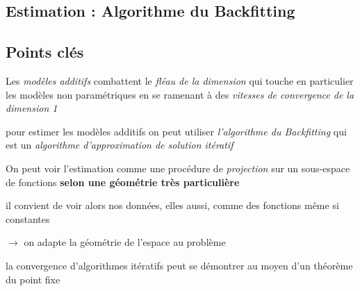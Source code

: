{
    {
        
    }
    \subsection{Estimation : Algorithme du Backfitting}
    {
        
    }
    \subsection{Points clés}\label{sec:backfitting_key_points}

    \begin{todolist}
        \item Les \emph{modèles additifs} combattent le \emph{fléau de la dimension} qui touche en particulier les modèles non paramétriques en se ramenant à des \emph{vitesses de convergence de la dimension 1}
        \item pour estimer les modèles additifs on peut utiliser \emph{l'algorithme du Backfitting} qui est un \emph{algorithme d'approximation de solution itératif}
        \item On peut voir l'estimation comme une procédure de \emph{projection} sur un sous-espace de fonctions \textbf{selon une géométrie très particulière}
        \item il convient de voir alors nos données, elles aussi, comme des fonctions même si constantes
        \item $\longrightarrow$ on adapte la géométrie de l'espace au problème
        \item la convergence d'algorithmes itératifs peut se démontrer au moyen d'un théorème du point fixe
    \end{todolist}

    }
